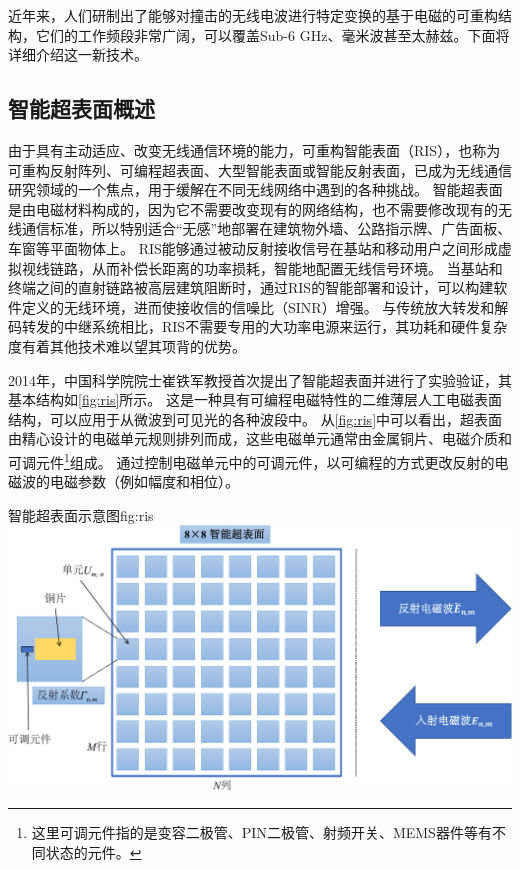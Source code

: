 \documentclass[supercite]{HustGraduPaper}
\begin{document}
近年来，人们研制出了能够对撞击的无线电波进行特定变换的基于电磁的可重构结构，它们的工作频段非常广阔，可以覆盖Sub-6 GHz、毫米波甚至太赫兹\cite{Wu2019}。下面将详细介绍这一新技术。

\subsection{智能超表面概述}

由于具有主动适应、改变无线通信环境的能力，可重构智能表面（RIS），也称为可重构反射阵列、可编程超表面、大型智能表面或智能反射表面，已成为无线通信研究领域的一个焦点，用于缓解在不同无线网络中遇到的各种挑战\cite{liu2020ris, huang2020holographic}。
智能超表面是由电磁材料构成的，因为它不需要改变现有的网络结构，也不需要修改现有的无线通信标准，所以特别适合“无感”地部署在建筑物外墙、公路指示牌、广告面板、车窗等平面物体上。
RIS能够通过被动反射接收信号在基站和移动用户之间形成虚拟视线链路，从而补偿长距离的功率损耗，智能地配置无线信号环境。
当基站和终端之间的直射链路被高层建筑阻断时，通过RIS的智能部署和设计，可以构建软件定义的无线环境，进而使接收信的信噪比（SINR）增强。
与传统放大转发和解码转发的中继系统相比，RIS不需要专用的大功率电源来运行，其功耗和硬件复杂度有着其他技术难以望其项背的优势\cite{di2020reconfigurable}。

2014年，中国科学院院士崔铁军教授首次提出了智能超表面并进行了实验验证，其基本结构如\autoref{fig:ris}所示\cite{cui2014coding}。
这是一种具有可编程电磁特性的二维薄层人工电磁表面结构，可以应用于从微波到可见光的各种波段中\cite{CHN_zhang2017}。
从\autoref{fig:ris}中可以看出，超表面由精心设计的电磁单元规则排列而成，这些电磁单元通常由金属铜片、电磁介质和可调元件\footnote{这里可调元件指的是变容二极管、PIN二极管、射频开关、MEMS器件等有不同状态的元件。}组成。
通过控制电磁单元中的可调元件，以可编程的方式更改反射的电磁波的电磁参数（例如幅度和相位）\cite{CHN_zhou2020}。

\begin{generalfig}[htb]{智能超表面示意图}{fig:ris}
	\includegraphics[width=0.8\linewidth]{Figures/ris.pdf}
\end{generalfig}
\end{document}
